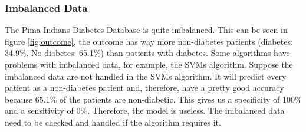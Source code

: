\documentclass[11pt]{article}
\begin{document}
 	\subsubsection{Imbalanced Data}
 	The Pima Indians Diabetes Database \cite{Pima} is quite imbalanced. This can be seen in figure \ref{fig:outcome}, the outcome has way more non-diabetes patients (diabetes:  34.9\%, No diabetes: 65.1\%) than patients with diabetes. Some algorithms have problems with imbalanced data, for example, the SVMs algorithm. Suppose the imbalanced data are not handled in the SVMs algorithm. It will predict every patient as a non-diabetes patient and, therefore, have a pretty good accuracy because 65.1\% of the patients are non-diabetic. This gives us a specificity of 100\% and a sensitivity of 0\%. Therefore, the model is useless. The imbalanced data need to be checked and handled if the algorithm requires it.
	
\end{document}
